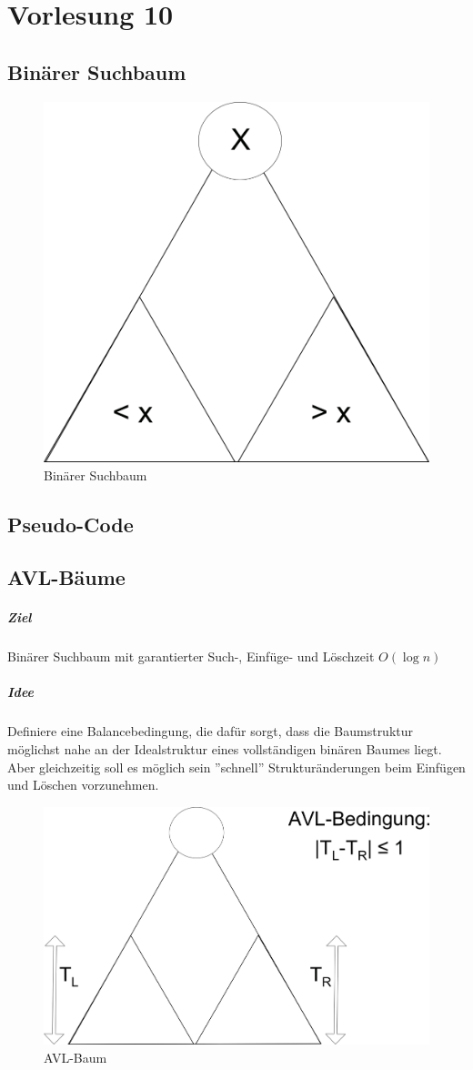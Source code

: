\chapter{Vorlesung 10}
\section{Binärer Suchbaum}

\begin{figure}[H]
\includegraphics[width=0.2\linewidth]{10/Grafik/img1.png}
\captionsetup{justification=raggedright, singlelinecheck=false}
\caption{Binärer Suchbaum}
\end{figure}

\section{Pseudo-Code}


\pagebreak

\section{AVL-Bäume}
\paragraph{Ziel}Binärer Suchbaum mit garantierter Such-, Einfüge- und Löschzeit $O(\log n )$
\paragraph{Idee} Definiere eine Balancebedingung, die dafür sorgt, dass die Baumstruktur möglichst nahe an der Idealstruktur eines vollständigen binären Baumes liegt.\\
Aber gleichzeitig soll es möglich sein ''schnell'' Strukturänderungen beim Einfügen und Löschen vorzunehmen. \\

\begin{figure}[H]
\includegraphics[width=0.4\linewidth]{10/Grafik/img2.png}
\captionsetup{justification=raggedright, singlelinecheck=false}
\caption{AVL-Baum}
\end{figure}


